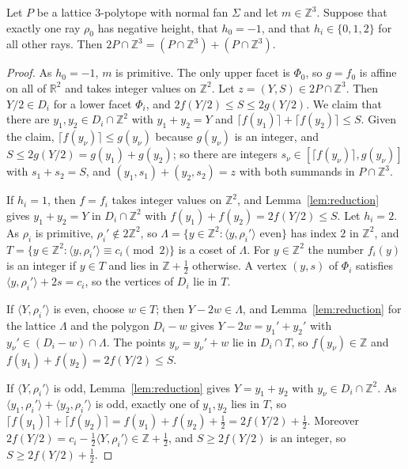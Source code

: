 \documentclass[12pt]{article}
\newcommand{\R}{\mathbb{R}}
\newcommand{\Z}{\mathbb{Z}}
\newcommand{\inn}[2]{\langle #1,#2\rangle}
\begin{document}
\begin{proposition}\label{prop:proj2}
Let $P$ be a lattice $3$-polytope with normal fan $\Sigma$ and let $m\in\Z^3$. Suppose that exactly one ray $\rho_0$ has negative height, that $h_0=-1$, and that $h_i\in\{0,1,2\}$ for all other rays. Then $2P\cap\Z^3=(P\cap\Z^3)+(P\cap\Z^3)$.
\end{proposition}

\begin{proof}
As $h_0=-1$, $m$ is primitive. The only upper facet is $\Phi_0$, so $g=f_0$ is affine on all of $\R^2$ and takes integer values on $\Z^2$. Let $z=(Y,S)\in2P\cap\Z^3$. Then $Y/2\in D_i$ for a lower facet $\Phi_i$, and $2f(Y/2)\le S\le2g(Y/2)$. We claim that there are $y_1,y_2\in D_i\cap\Z^2$ with $y_1+y_2=Y$ and $\lceil f(y_1)\rceil+\lceil f(y_2)\rceil\le S$. Given the claim, $\lceil f(y_\nu)\rceil\le g(y_\nu)$ because $g(y_\nu)$ is an integer, and $S\le2g(Y/2)=g(y_1)+g(y_2)$; so there are integers $s_\nu\in[\lceil f(y_\nu)\rceil,g(y_\nu)]$ with $s_1+s_2=S$, and $(y_1,s_1)+(y_2,s_2)=z$ with both summands in $P\cap\Z^3$.

If $h_i=1$, then $f=f_i$ takes integer values on $\Z^2$, and Lemma~\ref{lem:reduction} gives $y_1+y_2=Y$ in $D_i\cap\Z^2$ with $f(y_1)+f(y_2)=2f(Y/2)\le S$. Let $h_i=2$. As $\rho_i$ is primitive, $\rho_i'\notin2\Z^2$, so $\Lambda=\{y\in\Z^2:\inn{y}{\rho_i'}\text{ even}\}$ has index $2$ in $\Z^2$, and $T=\{y\in\Z^2:\inn{y}{\rho_i'}\equiv c_i\pmod 2\}$ is a coset of $\Lambda$. For $y\in\Z^2$ the number $f_i(y)$ is an integer if $y\in T$ and lies in $\Z+\frac12$ otherwise. A vertex $(y,s)$ of $\Phi_i$ satisfies $\inn{y}{\rho_i'}+2s=c_i$, so the vertices of $D_i$ lie in $T$.

If $\inn{Y}{\rho_i'}$ is even, choose $w\in T$; then $Y-2w\in\Lambda$, and Lemma~\ref{lem:reduction} for the lattice $\Lambda$ and the polygon $D_i-w$ gives $Y-2w=y_1'+y_2'$ with $y_\nu'\in(D_i-w)\cap\Lambda$. The points $y_\nu=y_\nu'+w$ lie in $D_i\cap T$, so $f(y_\nu)\in\Z$ and $f(y_1)+f(y_2)=2f(Y/2)\le S$.

If $\inn{Y}{\rho_i'}$ is odd, Lemma~\ref{lem:reduction} gives $Y=y_1+y_2$ with $y_\nu\in D_i\cap\Z^2$. As $\inn{y_1}{\rho_i'}+\inn{y_2}{\rho_i'}$ is odd, exactly one of $y_1,y_2$ lies in $T$, so $\lceil f(y_1)\rceil+\lceil f(y_2)\rceil=f(y_1)+f(y_2)+\frac12=2f(Y/2)+\frac12$. Moreover $2f(Y/2)=c_i-\frac12\inn{Y}{\rho_i'}\in\Z+\frac12$, and $S\ge2f(Y/2)$ is an integer, so $S\ge2f(Y/2)+\frac12$.
\end{proof}
\end{document}
